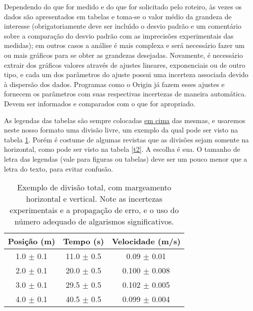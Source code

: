 \documentclass[twocolumn]{article}
\newcommand{\2}{\hspace{5mm}}
\newcommand{\5}{\vspace{5mm}}
\newcommand{\7}{\vspace{7mm}}
\begin{document}
\2 Dependendo do que for medido e do que for solicitado pelo roteiro, \`as 
vezes os dados s\~ao apresentados em tabelas e toma-se o valor m\'edio da 
grandeza de interesse (obrigatoriamente deve ser inclu\'{\i}do o desvio 
padr\~ao e um coment\'ario sobre a compara\c{c}\~ao do desvio padr\~ao com 
as imprecis\~oes experimentais das medidas); em outros casos a an\'alise 
\'e mais complexa e ser\'a necess\'ario fazer um ou mais gr\'aficos para 
se obter as grandezas desejadas. Novamente, \'e necess\'ario extrair dos 
gr\'aficos valores atrav\'es de ajustes lineares, exponenciais ou de outro 
tipo, e cada um dos par\^ametros do ajuste possui uma incerteza associada 
devido \`a dispers\~ao dos dados. Programas como o Origin j\'a fazem esses 
ajustes e fornecem os par\^ametros com suas respectivas incertezas de 
maneira autom\'atica. Devem ser informados e comparados com o que for 
apropriado.

\2 As legendas das tabelas s\~ao sempre colocadas \underline{em cima} das 
mesmas, e usaremos neste nosso formato uma divis\~ao livre, um exemplo da 
qual pode ser visto na tabela \ref{t1}. Por\'em \'e costume de algumas 
revistas que as divis\~oes sejam somente na horizontal, como pode ser visto 
na tabela \ref{t2}. A escolha \'e sua. O tamanho de letra das legendas 
(vale para figuras ou tabelas) deve ser um pouco menor que a letra do texto, 
para evitar confus\~ao.

\begin{table} 
\caption{\small Exemplo de divis\~ao total, com margeamento horizontal e 
vertical. Note as incertezas experimentais e a propaga\c{c}\~ao de erro, 
e o uso do n\'umero adequado de algarismos significativos.}
\begin{center}
\begin{tabular}{|c|c|c|} \hline
{\bf Posi\c{c}\~ao (m)} & {\bf Tempo (s)} & {\bf Velocidade (m/s)} \\ \hline
1.0 $\pm$ 0.1 & 11.0 $\pm$ 0.5 & 0.09 $\pm$ 0.01 \\ \hline
2.0 $\pm$ 0.1 & 20.0 $\pm$ 0.5 & 0.100 $\pm$ 0.008 \\ \hline
3.0 $\pm$ 0.1 & 29.5 $\pm$ 0.5 & 0.102 $\pm$ 0.005 \\ \hline
4.0 $\pm$ 0.1 & 40.5 $\pm$ 0.5 & 0.099 $\pm$ 0.004 \\ \hline
\end{tabular}
\end{center}
\label{t1}
\end{table}
\end{document}
